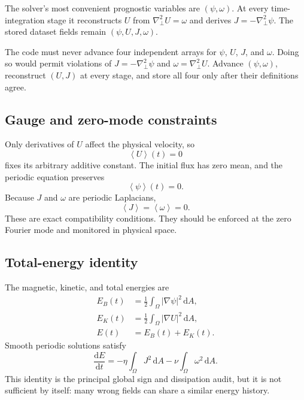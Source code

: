 \documentclass[11pt]{article}
\newcommand{\dd}{\mathrm{d}}
\newcommand{\average}[1]{\left\langle #1\right\rangle}
\newcommand{\Lap}{\nabla_{\!\perp}^{2}}
\begin{document}
The solver's most convenient prognostic variables are $(\psi,\omega)$. At every time-integration stage it reconstructs $U$ from $\Lap U=\omega$ and derives $J=-\Lap\psi$. The stored dataset fields remain $(\psi,U,J,\omega)$.

\begin{conventionbox}
The code must never advance four independent arrays for $\psi$, $U$, $J$, and $\omega$. Doing so would permit violations of $J=-\Lap\psi$ and $\omega=\Lap U$. Advance $(\psi,\omega)$, reconstruct $(U,J)$ at every stage, and store all four only after their definitions agree.
\end{conventionbox}

\subsection{Gauge and zero-mode constraints}

Only derivatives of $U$ affect the physical velocity, so
\begin{equation}
\average{U}(t)=0
\end{equation}
fixes its arbitrary additive constant. The initial flux has zero mean, and the periodic equation preserves
\begin{equation}
\average{\psi}(t)=0.
\end{equation}
Because $J$ and $\omega$ are periodic Laplacians,
\begin{equation}
\average{J}=\average{\omega}=0.
\end{equation}
These are exact compatibility conditions. They should be enforced at the zero Fourier mode and monitored in physical space.

\subsection{Total-energy identity}

The magnetic, kinetic, and total energies are
\begin{align}
E_B(t)&=\frac12\int_\Omega|\nabla\psi|^2\,\dd A,\\
E_K(t)&=\frac12\int_\Omega|\nabla U|^2\,\dd A,\\
E(t)&=E_B(t)+E_K(t).
\end{align}
Smooth periodic solutions satisfy
\begin{equation}
\boxed{
\frac{\dd E}{\dd t}
=-\eta\int_\Omega J^2\,\dd A
-\nu\int_\Omega\omega^2\,\dd A.}
\label{eq:energy}
\end{equation}
This identity is the principal global sign and dissipation audit, but it is not sufficient by itself: many wrong fields can share a similar energy history.
\end{document}
